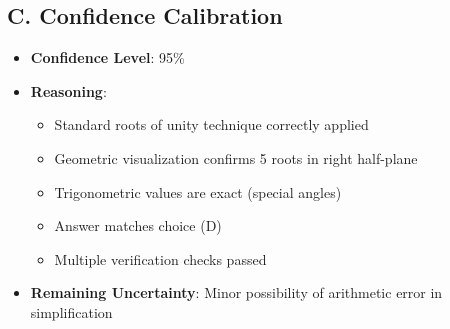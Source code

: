 \documentclass[11pt]{article}
\begin{document}
\begin{verificationbox}
\subsection*{C. Confidence Calibration}

\begin{itemize}[leftmargin=*]
    \item \textbf{Confidence Level}: 95\%
    \item \textbf{Reasoning}:
    \begin{itemize}
        \item Standard roots of unity technique correctly applied
        \item Geometric visualization confirms 5 roots in right half-plane
        \item Trigonometric values are exact (special angles)
        \item Answer matches choice (D)
        \item Multiple verification checks passed
    \end{itemize}
    \item \textbf{Remaining Uncertainty}: Minor possibility of arithmetic error in simplification
\end{itemize}
\end{verificationbox}
\end{document}

